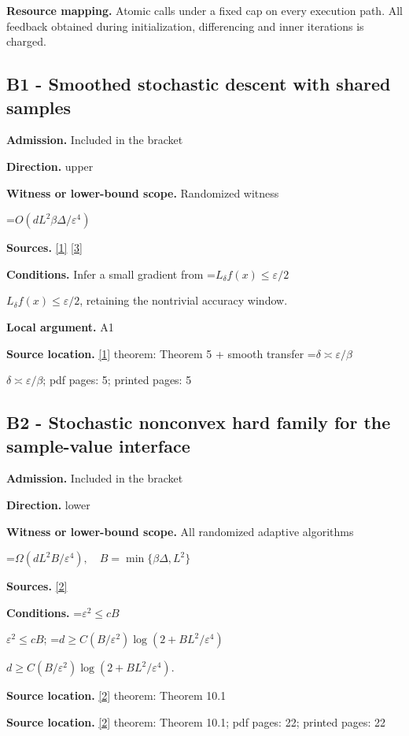 \documentclass[10pt,a4paper]{article}
\newcommand{\AtlasMath}[1]{\par\begingroup\centering\setbox0=\hbox{$\displaystyle #1$}\ifdim\wd0>1.4\linewidth\typeout{ATLAS WIDE FORMULA: \the\wd0}\fi\ifdim\wd0>\linewidth\resizebox{\linewidth}{!}{\box0}\else\box0\fi\par\endgroup}
\newcommand{\AtlasInlineMath}[1]{\begingroup\setbox0=\hbox{$#1$}\ifdim\wd0>.4\linewidth\endgroup\AtlasMath{#1}\else\endgroup$#1$\fi}
\begin{document}
\textbf{Resource mapping.} Atomic calls under a fixed cap on every execution path. All feedback obtained during initialization, differencing and inner iterations is charged.

\subsection{B1 - Smoothed stochastic descent with shared samples}
\textbf{Admission.} Included in the bracket

\textbf{Direction.} upper

\textbf{Witness or lower-bound scope.} Randomized witness

\AtlasMath{O(dL^2\beta \Delta/\varepsilon^4)}
\textbf{Sources.} \href{https://www.jmlr.org/papers/volume25/23-1159/23-1159.pdf}{[1]} \href{https://arxiv.org/html/2610.00275v2}{[3]}

\textbf{Conditions.} Infer a small gradient from \AtlasInlineMath{L_\delta f(x)\le\varepsilon/2}, retaining the nontrivial accuracy window.

\textbf{Local argument.} A1

\textbf{Source location.} \href{https://www.jmlr.org/papers/volume25/23-1159/23-1159.pdf}{[1]} theorem: Theorem 5 + smooth transfer \AtlasInlineMath{\delta\asymp\varepsilon/\beta}; pdf pages: 5; printed pages: 5

\subsection{B2 - Stochastic nonconvex hard family for the sample-value interface}
\textbf{Admission.} Included in the bracket

\textbf{Direction.} lower

\textbf{Witness or lower-bound scope.} All randomized adaptive algorithms

\AtlasMath{\Omega(dL^2B/\varepsilon^4),\quad B=\min\{\beta \Delta,L^2\}}
\textbf{Sources.} \href{https://arxiv.org/html/2610.19652v1}{[2]}

\textbf{Conditions.} \AtlasInlineMath{\varepsilon^2\le cB}; \AtlasInlineMath{d\ge C(B/\varepsilon^2)\log(2+BL^2/\varepsilon^4)}.

\textbf{Source location.} \href{https://arxiv.org/html/2610.19652v1}{[2]} theorem: Theorem 10.1

\textbf{Source location.} \href{https://arxiv.org/html/2610.19652v1}{[2]} theorem: Theorem 10.1; pdf pages: 22; printed pages: 22
\end{document}
